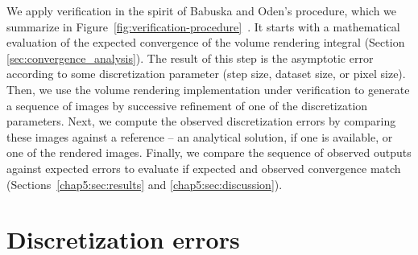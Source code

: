 
We apply verification in the spirit of Babuska and Oden's procedure,
which we summarize in
Figure~\ref{fig:verification-procedure}~\cite{babuska04}. It starts
with a mathematical evaluation of the expected convergence of the
volume rendering integral (Section
\ref{sec:convergence_analysis}). The result of this step is the
asymptotic error according to some discretization parameter (step
size, dataset size, or pixel size). Then, we use the volume rendering
implementation under verification to generate a sequence of images by
successive refinement of one of the discretization parameters. Next,
we compute the observed discretization errors by comparing these
images against a reference -- an analytical solution, if one is
available, or one of the rendered images. Finally, we compare the
sequence of observed outputs against expected errors to evaluate if expected
and observed convergence match (Sections~\ref{chap5:sec:results} and
\ref{chap5:sec:discussion}).  


\section{Discretization errors}
\label{sec:volume-rendering}

